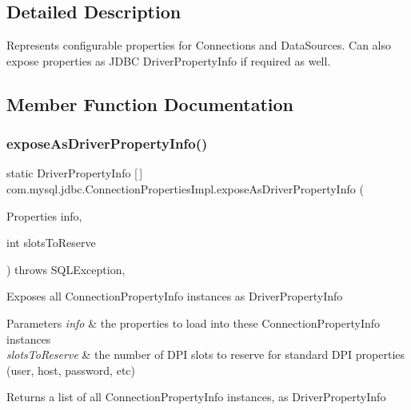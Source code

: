 \subsection{Detailed Description}
Represents configurable properties for Connections and Data\+Sources. Can also expose properties as J\+D\+BC Driver\+Property\+Info if required as well. 

\subsection{Member Function Documentation}
\mbox{\label{classcom_1_1mysql_1_1jdbc_1_1_connection_properties_impl_a810088febe63fb8c4bf25651f6b92020}} 
\subsubsection{\texorpdfstring{expose\+As\+Driver\+Property\+Info()}{exposeAsDriverPropertyInfo()}}
{\footnotesize\ttfamily static Driver\+Property\+Info \mbox{[}$\,$\mbox{]} com.\+mysql.\+jdbc.\+Connection\+Properties\+Impl.\+expose\+As\+Driver\+Property\+Info (\begin{DoxyParamCaption}\item[{Properties}]{info,  }\item[{int}]{slots\+To\+Reserve }\end{DoxyParamCaption}) throws S\+Q\+L\+Exception\hspace{0.3cm}{\ttfamily [static]}, {\ttfamily [protected]}}

Exposes all Connection\+Property\+Info instances as Driver\+Property\+Info


\begin{DoxyParams}{Parameters}
{\em info} & the properties to load into these Connection\+Property\+Info instances \\
\hline
{\em slots\+To\+Reserve} & the number of D\+PI slots to reserve for \textquotesingle{}standard\textquotesingle{} D\+PI properties (user, host, password, etc) \\
\hline
\end{DoxyParams}
\begin{DoxyReturn}{Returns}
a list of all Connection\+Property\+Info instances, as Driver\+Property\+Info 
\end{DoxyReturn}

